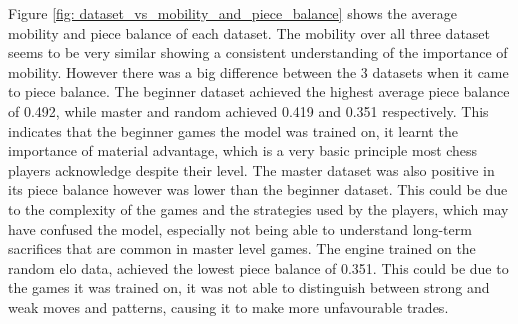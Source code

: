 Figure \ref{fig: dataset_vs_mobility_and_piece_balance} shows the average mobility and piece balance of each dataset. The mobility over all three dataset seems to be very similar showing a consistent understanding of the importance of mobility. However there was a big difference between the 3 datasets when it came to piece balance. The beginner dataset achieved the highest average piece balance of 0.492, while master and random achieved 0.419 and 0.351 respectively. This indicates that the beginner games the model was trained on, it learnt the importance of material advantage, which is a very basic principle most chess players acknowledge despite their level. The master dataset was also positive in its piece balance however was lower than the beginner dataset. This could be due to the complexity of the games and the strategies used by the players, which may have confused the model, especially not being able to understand long-term sacrifices that are common in master level games. The engine trained on the random elo data, achieved the lowest piece balance of 0.351. This could be due to the games it was trained on, it was not able to distinguish between strong and weak moves and patterns, causing it to make more unfavourable trades. 







